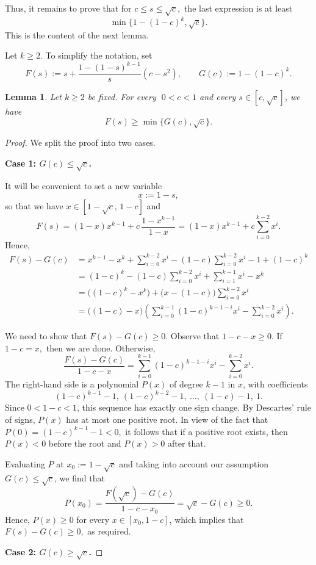 \documentclass[12pt]{article}
\theoremstyle{plain}
\newtheorem{lemma}[theorem]{Lemma}
\theoremstyle{definition}
\theoremstyle{remark}
\begin{document}
Thus, it remains to prove that for $c\le s\le \sqrt c,$ the last expression is at least $$\min\{1-(1-c)^k,\sqrt c\}.$$
This is the content of the next lemma.

Let $k\ge 2$. To simplify the notation, set
\[
F(s):=s+\frac{1-(1-s)^{k-1}}{s}(c-s^2),\qquad  G(c):=1-(1-c)^k.
\]


\begin{lemma}\label{lemma2}
Let $k\ge 2$ be fixed. For every $\;0<c<1$ and every $s\in[c,\sqrt c]$, we have
\[
F(s)\ge \min\{G(c),\sqrt c\}.
\]
\end{lemma}

\begin{proof}
We split the proof into two cases.

\medskip
\noindent\textbf{Case 1: $G(c)\le \sqrt c$.}
\smallskip

It will be convenient to set a new variable
\[
x:=1-s,
\]
so that we have $x\in[1-\sqrt c,\,1-c]$ and
\[
F(s)=(1-x)x^{k-1}+c\,\frac{1-x^{k-1}}{1-x}=(1-x)x^{k-1}+c\sum_{i=0}^{k-2}x^i.
\]
Hence,
\begin{align*}
F(s)-G(c)
&=x^{k-1}-x^k+\sum_{i=0}^{k-2}x^i-(1-c)\sum_{i=0}^{k-2}x^i-1+(1-c)^k \\
&=(1-c)^k-(1-c)\sum_{i=0}^{k-2}x^i+\sum_{i=1}^{k-1}x^i-x^k \\
&=\bigl((1-c)^k-x^k\bigr)+\bigl(x-(1-c)\bigr)\sum_{i=0}^{k-2}x^i \\
&=\bigl((1-c)-x\bigr)\left(\sum_{i=0}^{k-1}(1-c)^{k-1-i}x^i-\sum_{i=0}^{k-2}x^i\right).
\end{align*}

We need to show that $F(s)-G(c)\ge 0$. Observe that $1-c-x\ge0.$ If $1-c=x,$ then we are done. Otherwise,
\[
\frac{F(s)-G(c)}{1-c-x}=\sum_{i=0}^{k-1}(1-c)^{k-1-i}x^i-\sum_{i=0}^{k-2}x^i.
\]
The right-hand side is a polynomial $P(x)$ of degree $k-1$ in $x$, with coefficients
\[
(1-c)^{k-1}-1,\ (1-c)^{k-2}-1,\ \dots,\ (1-c)-1,\ 1.
\]
Since $0<1-c<1$, this sequence has exactly one sign change. By Descartes' rule of signs, $P(x)$ has at most one positive root.
In view of the fact that $P(0)=(1-c)^{k-1}-1<0,$ it follows that if a positive root exists, then $P(x)<0$ before the root and $P(x)>0$ after that.


Evaluating $P$ at $x_0:=1-\sqrt c$ and taking into account our assumption $G(c)\le \sqrt c$,  we find that
\[
P(x_0)=\frac{F(\sqrt c)-G(c)}{1-c-x_0}=\sqrt{c}-G(c)\ge 0.
\]
Hence, $P(x)\ge 0$ for every $x\in[x_0,1-c]$, which implies that
$F(s)-G(c)\ge 0,$ as required.

\medskip
\noindent\textbf{Case 2: $G(c)\ge \sqrt c$.}
\smallskip


\end{proof}
\end{document}
